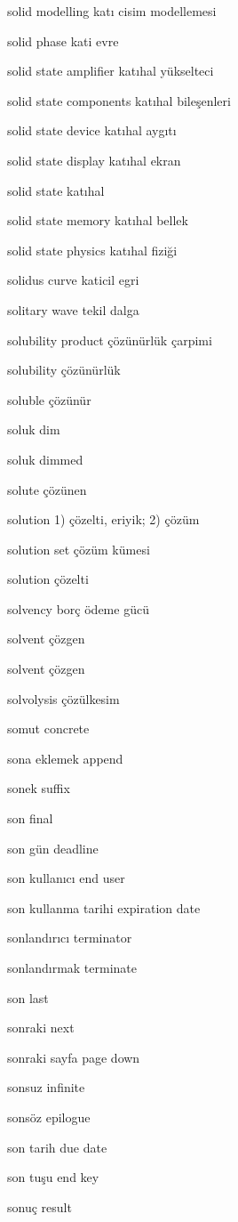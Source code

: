 \documentclass[12pt,fleqn]{article}\usepackage{../../common}
\begin{document}
solid modelling katı cisim modellemesi

solid phase kati evre

solid state amplifier katıhal yükselteci

solid state components katıhal bileşenleri

solid state device katıhal aygıtı

solid state display katıhal ekran

solid state katıhal

solid state memory katıhal bellek

solid state physics katıhal fiziği

solidus curve katicil egri

solitary wave tekil dalga

solubility product çözünürlük çarpimi

solubility çözünürlük

soluble çözünür

soluk dim

soluk dimmed

solute çözünen

solution 1) çözelti, eriyik; 2) çözüm

solution set çözüm kümesi

solution çözelti

solvency borç ödeme gücü

solvent çözgen

solvent çözgen

solvolysis çözülkesim

somut concrete

sona eklemek append

sonek suffix

son final

son gün deadline

son kullanıcı end user

son kullanma tarihi expiration date

sonlandırıcı terminator

sonlandırmak terminate

son last

sonraki next

sonraki sayfa page down

sonsuz infinite

sonsöz epilogue

son tarih due date

son tuşu end key

sonuç result
\end{document}
